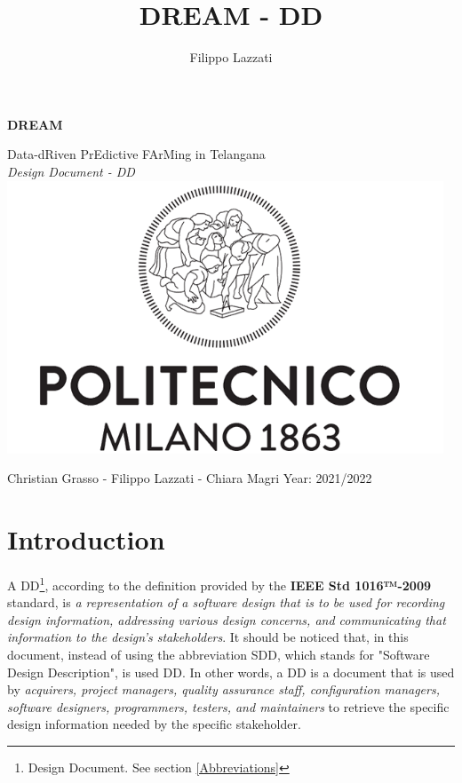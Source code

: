 \documentclass{article}
\title{DREAM - DD}
\author{Filippo Lazzati}
\begin{document}
\thispagestyle{empty} 
\begin{titlepage}
    \begin{center}
       {\Huge \textbf{DREAM}} %
       \vspace{0.5cm}
       \\
    \begin{LARGE}
        {Data-dRiven PrEdictive FArMing in Telangana}
        \vspace{1.0cm}
        \\
        {\textit{Design Document - DD}}
        \includegraphics[width=13cm]{logo/polimi.png}
       \vspace{1.5cm}
        
        {Christian Grasso - Filippo Lazzati - Chiara Magri}
       \vspace{0.5cm}
       {Year: 2021/2022}
       
    \end{LARGE}  
   \end{center}
\end{titlepage}
\newpage
\tableofcontents %
\newpage
\listoffigures
\newpage
\listoftables
\newpage
\section{Introduction}
A DD\footnote{Design Document. See section \ref{Abbreviations}}, according to the definition provided by the \textbf{IEEE Std 1016™-2009} standard, is \textit{a representation of a software design that is to be used for recording design information, addressing various design concerns, and communicating that information to the design’s stakeholders}. It should be noticed that, in this document, instead of using the abbreviation SDD, which stands for "Software Design Description", is used DD. In other words, a DD is a document that is used by \textit{acquirers, project managers, quality assurance staff, configuration managers, software designers, programmers, testers, and maintainers} to retrieve the specific design information needed by the specific stakeholder.
\end{document}
